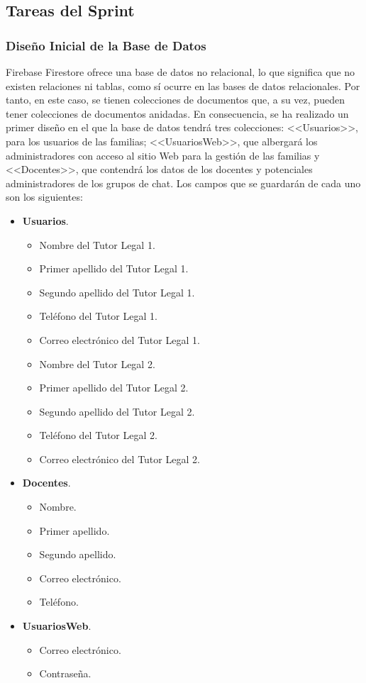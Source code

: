 \subsection{Tareas del Sprint}
\subsubsection{Diseño Inicial de la Base de Datos}
Firebase Firestore ofrece una base de datos no relacional, lo que significa que no existen relaciones ni tablas, como sí ocurre en las bases de datos relacionales. Por tanto, en este caso, se tienen colecciones de documentos que, a su vez, pueden tener colecciones de documentos anidadas. En consecuencia, se ha realizado un primer diseño en el que la base de datos tendrá tres colecciones: <<Usuarios>>, para los usuarios de las familias; <<UsuariosWeb>>, que albergará los administradores con acceso al sitio Web para la gestión de las familias y <<Docentes>>, que contendrá los datos de los docentes y potenciales administradores de los grupos de chat. Los campos que se guardarán de cada uno son los siguientes:

\begin{itemize}
	\item \textbf{Usuarios}.
		\begin{itemize}
			\item Nombre del Tutor Legal 1.
			\item Primer apellido del Tutor Legal 1.
			\item Segundo apellido del Tutor Legal 1.
			\item Teléfono del Tutor Legal 1.
			\item Correo electrónico del Tutor Legal 1.
			\item Nombre del Tutor Legal 2.
			\item Primer apellido del Tutor Legal 2.
			\item Segundo apellido del Tutor Legal 2.
			\item Teléfono del Tutor Legal 2.
			\item Correo electrónico del Tutor Legal 2.
		\end{itemize}
		
	\item \textbf{Docentes}.
		\begin{itemize}
			\item Nombre.
			\item Primer apellido.
			\item Segundo apellido.
			\item Correo electrónico.
			\item Teléfono.
		\end{itemize}
		
	\item \textbf{UsuariosWeb}.
		\begin{itemize}
			\item Correo electrónico.
			\item Contraseña.
		\end{itemize}
		
\end{itemize}

